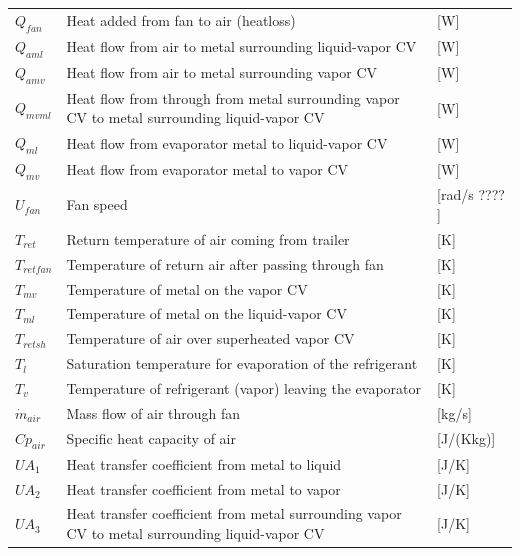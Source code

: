 \begin{center}
	\begin{tabular}{l p{10cm} l}
		$Q_{fan}$			& Heat added from fan to air (heatloss)			& [\si{W}] \\	
		$Q_{aml}$			& Heat flow from air to metal surrounding liquid-vapor CV			& [\si{W}] \\	
		$Q_{amv}$			& Heat flow from air to metal surrounding vapor CV			& [\si{W}] \\		
		$Q_{mvml}$			& Heat flow from through from metal surrounding vapor CV to metal surrounding liquid-vapor CV			& [\si{W}] \\	
		$Q_{ml}$			& Heat flow from evaporator metal to liquid-vapor CV			& [\si{W}] \\	
		$Q_{mv}$			& Heat flow from evaporator metal to vapor CV					& [\si{W}] \\			
		$U_{fan}$			& Fan speed 	& [rad/s ???? ]\\
		$T_{ret}$			& Return temperature of air coming from trailer 			& [\si{K}] \\		
		$T_{retfan}$		& Temperature of return air after passing through fan			& [\si{K}] \\		
		$T_{mv}$			& Temperature of metal on the vapor CV			& [\si{K}] \\
		$T_{ml}$			& Temperature of metal on the liquid-vapor CV			& [\si{K}] \\
		$T_{retsh}$			& Temperature of air over superheated vapor CV			& [\si{K}] \\
		$T_{l}$				& Saturation temperature for evaporation of the refrigerant			& [\si{K}] \\	
		$T_{v}$				& Temperature of refrigerant (vapor) leaving the evaporator		& [\si{K}] \\		
		$\dot{m}_{air}$		& Mass flow of air through fan			& [\si{kg}/\si{s}] \\		
		$Cp_{air}$			& Specific heat capacity of air			& [\si{J}/(\si{K}\si{kg})] \\	
		$UA_1$				& Heat transfer coefficient from metal to liquid			& [\si{J}/\si{K}] \\
		$UA_2$				& Heat transfer coefficient from metal to vapor			& [\si{J}/\si{K}] \\
		$UA_3$				& Heat transfer coefficient from metal surrounding vapor CV to metal surrounding liquid-vapor CV			& [\si{J}/\si{K}] \\
	\end{tabular}
\end{center}

